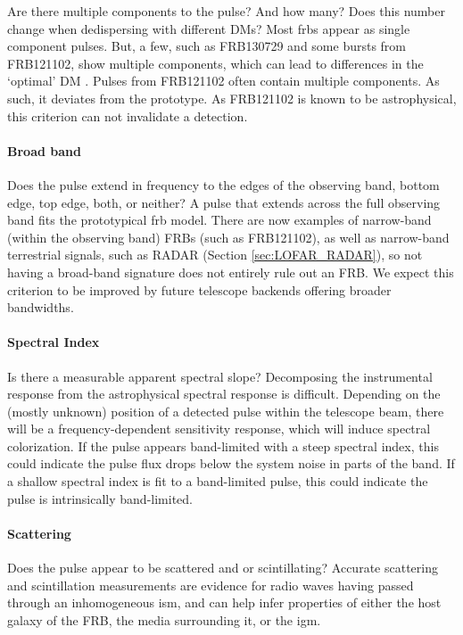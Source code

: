 \documentclass[a4paper,fleqn,usenatbib]{mnras}
\begin{document}
Are there multiple components to the pulse? And how many? Does this number
change when dedispersing with different DMs? Most \glspl{frb} appear as single
component pulses. But, a few, such as FRB130729 and some bursts from FRB121102,
show multiple components, which can lead to differences in the `optimal' DM
\citep{2018Natur.553..182M}. Pulses from FRB121102 often contain multiple
components. As such, it deviates from the prototype. As FRB121102 is known to
be astrophysical, this criterion can not invalidate a detection.

\paragraph{Broad band}

Does the pulse extend in frequency to the edges of the observing band, bottom
edge, top edge, both, or neither? A pulse that extends across the full observing
band fits the prototypical \gls{frb} model. There are now examples of
narrow-band (within the observing band) FRBs (such as FRB121102), as well as
narrow-band terrestrial signals, such as RADAR (Section \ref{sec:LOFAR_RADAR}),
so not having a broad-band signature does not entirely rule out an FRB.  We
expect this criterion to be improved by future telescope backends offering
broader bandwidths. 

\paragraph{Spectral Index}

Is there a measurable apparent spectral slope? Decomposing the instrumental
response from the astrophysical spectral response is difficult.  Depending on
the (mostly unknown) position of a detected pulse within the telescope beam,
there will be a frequency-dependent sensitivity response, which will induce
spectral colorization.  If the pulse appears band-limited with a steep spectral
index, this could indicate the pulse flux drops below the system noise in parts
of the band. If a shallow spectral index is fit to a band-limited pulse, this
could indicate the pulse is intrinsically band-limited.

\paragraph{Scattering}

Does the pulse appear to be scattered and or scintillating?  Accurate scattering
and scintillation measurements are evidence for radio waves having passed
through an inhomogeneous \gls{ism}, and can help infer properties of either the
host galaxy of the FRB,  the media surrounding it, or the \gls{igm}.
\end{document}
